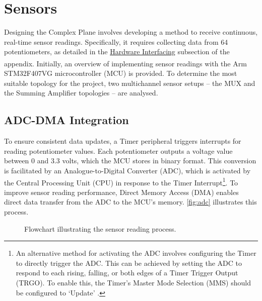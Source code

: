 \documentclass[12pt]{article}
\numberwithin{subsubsubsection}{subsubsection}
\begin{document}
 





\newpage








\section{Sensors}

Designing the Complex Plane involves developing a method to receive continuous, real-time sensor readings. Specifically, it requires collecting data from 64 potentiometers, as detailed in the \hyperref[appendix:hardwareinterfacing]{Hardware Interfacing} subsection of the appendix. Initially, an overview of implementing sensor readings with the Arm\textsuperscript{\textregistered} STM32F407VG microcontroller (MCU) is provided. To determine the most suitable topology for the project, two multichannel sensor setups – the MUX and the Summing Amplifier topologies – are analysed.

\subsection{ADC-DMA Integration}

To ensure consistent data updates, a Timer peripheral triggers interrupts for reading potentiometer values. Each potentiometer outputs a voltage value between 0 and 3.3 volts, which the MCU stores in binary format. This conversion is facilitated by an Analogue-to-Digital Converter (ADC), which is activated by the Central Processing Unit (CPU) in response to the Timer Interrupt\footnote{An alternative method for activating the ADC involves configuring the Timer to directly trigger the ADC. This can be achieved by setting the ADC to respond to each rising, falling, or both edges of a Timer Trigger Output (TRGO). To enable this, the Timer's Master Mode Selection (MMS) should be configured to `Update' \cite{STM32_reference}.}. To improve sensor reading performance, Direct Memory Access (DMA) enables direct data transfer from the ADC to the MCU’s memory. \autoref{fig:adc} illustrates this process.

\begin{figure}[ht]
    \centering
    \caption{Flowchart illustrating the sensor reading process.}
    \label{fig:adc}
\end{figure}
\end{document}
